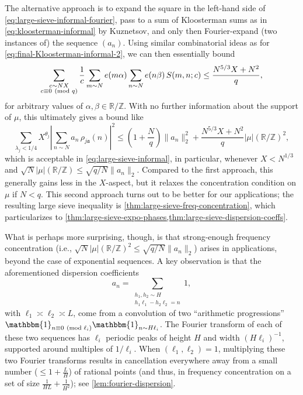 \documentclass[reqno,11pt]{amsart}
\theoremstyle{remark}
\numberwithin{equation}{section}
\newcommand{\Z}{\mathbb{Z}}
\newcommand{\R}{\mathbb{R}}
\newcommand{\ma}{\mathfrak{a}}
\newcommand{\one}{\mathbbm{1}}
\renewcommand{\pmod}[1]{\ (\textnormal{mod } #1)}
\begin{document}
The alternative approach is to expand the square in the left-hand side of \cref{eq:large-sieve-informal-fourier}, pass to a sum of Kloosterman sums as in \cref{eq:kloosterman-informal} by Kuznetsov, and only then Fourier-expand (two instances of) the sequence $(a_n)$. Using similar combinatorial ideas as for \cref{eq:final-Kloosterman-informal-2}, we can then essentially bound
\begin{equation} \label{eq:final-Kloosterman-informal-3}
    \sum_{\substack{c \sim NX \\ c \equiv 0 \pmod{q}}} \frac{1}{c} \sum_{m \sim N} e(m\alpha) \sum_{n \sim N} e(n\beta)\, S(m, n; c)
    \le
    \frac{N^{5/3} X + N^2}{q},
\end{equation}
for arbitrary values of $\alpha, \beta \in \R/\Z$. With no further information about the support of $\mu$, this ultimately gives a bound like
\[
    \sum_{\lambda_j < 1/4} X^{\theta_j} \left\vert \sum_{n \sim N} a_n\, \rho_{j\ma}(n) \right\vert^2 \le \left(1 + \frac{N}{q}\right) \|a_n\|_2^2 
    +
    \frac{N^{5/3}X + N^2}{q} |\mu|(\R/\Z)^2,
\]
which is acceptable in \cref{eq:large-sieve-informal}, in particular, whenever $X < N^{1/3}$ and $\sqrt{N} |\mu|(\R/\Z) \le \sqrt{q/N} \|a_n\|_2$.
Compared to the first approach, this generally gains less in the $X$-aspect, but it relaxes the concentration condition on $\mu$ if $N < q$. This second approach turns out to be better for our applications; the resulting large sieve inequality is \cref{thm:large-sieve-freq-concentration}, which particularizes to \cref{thm:large-sieve-expo-phases,thm:large-sieve-dispersion-coeffs}.

What is perhaps more surprising, though, is that strong-enough frequency concentration (i.e., $\sqrt{N} |\mu|(\R/\Z)^2 \le \sqrt{q/N} \|a_n\|_2$) arises in applications, beyond the case of exponential sequences. A key observation is that the aforementioned dispersion coefficients
\begin{equation} \label{eq:disp-coeff-informal}
    a_n = \sum_{\substack{h_1, h_2 \sim H \\ h_1 \ell_1 - h_2 \ell_2 = n}} 1,
\end{equation}
with $\ell_1 \asymp \ell_2 \asymp L$,
come from a convolution of two ``arithmetic progressions'' $\one_{n \equiv 0 \pmod{\ell_i}} \one_{n \sim H\ell_i}$. The Fourier transform of each of these two sequences has $\ell_i$ periodic peaks of height $H$ and width $(H \ell_i)^{-1}$, supported around multiples of $1/\ell_i$. When $(\ell_1, \ell_2) = 1$, multiplying these two Fourier transforms results in cancellation everywhere away from a small number ($\le 1 + \frac{L}{H}$) of rational points (and thus, in frequency concentration on a set of size $\frac{1}{HL} + \frac{1}{H^2}$); see \cref{lem:fourier-dispersion}. %
\end{document}
